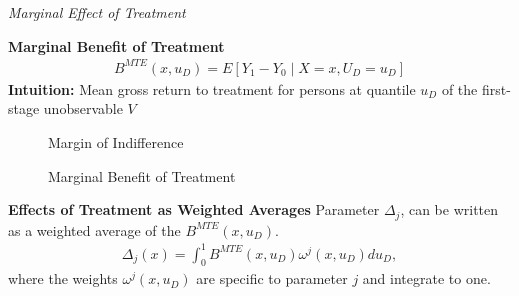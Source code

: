 \begin{frame}\begin{center}
		\LARGE\textit{Marginal Effect of Treatment}
\end{center}\end{frame}
\begin{frame}\textbf{Marginal Benefit of Treatment}
	\begin{align*}
		B^{MTE}(x, u_D) = E [Y_1 - Y_0 \mid X = x,  U_D = u_D]
	\end{align*}
	\textbf{Intuition:} Mean gross return to treatment for persons at
	quantile \(u_D\) of the first-stage unobservable \(V\)
\end{frame}
\begin{frame}
	\begin{figure}\caption{Margin of Indifference}
	\end{figure}
\end{frame}
\begin{frame}
	\begin{figure}\caption{Marginal Benefit of Treatment}
	\end{figure}
\end{frame}
\begin{frame}
	\textbf{Effects of Treatment as Weighted Averages}
	Parameter \(\Delta_j\), can be written as a weighted average of the
	\(B^{MTE}(x, u_D)\).
	\begin{align*}
		\Delta_j(x) = \int_0^1 B^{MTE}(x, u_D) \omega^j(x, u_D) du_D,
	\end{align*}
	where the weights \(\omega^j(x, u_D)\) are specific to parameter \(j\)
	and integrate to one.
\end{frame}
